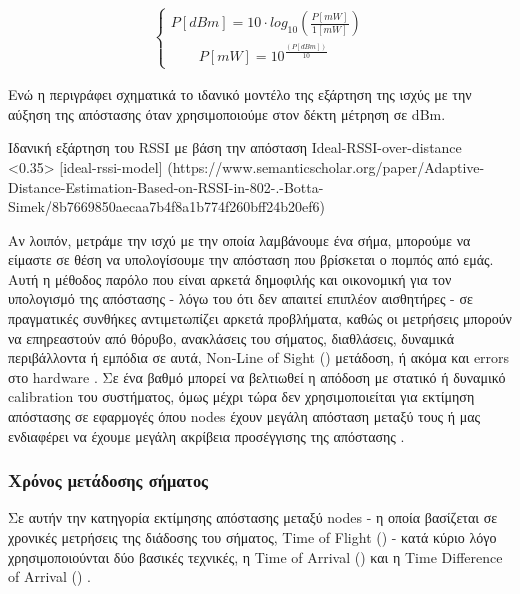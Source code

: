 \begin{align}
	\left\{
		\begin{array}{ll}
			P[dBm]= 10\cdot log_{10}\left(\frac{P[mW]}{1[mW]}\right) \\[10pt]
			\quad \quad P[mW] = 10^\frac{(P[dBm])}{10}
		\end{array}
	\right.
\end{align}

Ενώ η  περιγράφει σχηματικά το ιδανικό μοντέλο της εξάρτηση της ισχύς με την αύξηση
της απόστασης όταν χρησιμοποιούμε στον δέκτη μέτρηση σε dΒm. 


%
{Ιδανική εξάρτηση του RSSI με βάση την απόσταση}%
{Ideal-RSSI-over-distance}%
<0.35>%
[ideal-rssi-model]%
(https://www.semanticscholar.org/paper/Adaptive-Distance-Estimation-Based-on-RSSI-in-802-.-Botta-Simek/8b7669850aecaa7b4f8a1b774f260bff24b20ef6)

Αν λοιπόν, μετράμε την ισχύ με την οποία λαμβάνουμε ένα σήμα, μπορούμε να είμαστε σε θέση να υπολογίσουμε την απόσταση που βρίσκεται
ο πομπός από εμάς.
Αυτή η μέθοδος παρόλο που είναι αρκετά δημοφιλής και οικονομική για τον υπολο\-γισμό της απόστασης
- λόγω του ότι δεν απαιτεί επιπλέον αισθητήρες - σε πρα\-γματικές 
συνθήκες αντιμετωπίζει αρκετά προβλήματα, καθώς οι μετρήσεις μπορούν να επηρεαστούν από θόρυβο,
ανακλάσεις του σήματος, διαθλάσεις, δυναμικά περιβάλλοντα ή εμπόδια σε αυτά, Non-Line of Sight () μετάδοση, 
ή ακόμα και errors στο hardware 
\cite{wsn-Localization-systems} \cite{ideal-rssi-model}.
Σε ένα βαθμό μπορεί να βελτιωθεί η απόδοση με στατικό ή δυναμικό calibration του συστήματος,
όμως μέχρι τώρα δεν χρησιμοποιείται για εκτίμηση απόστασης σε εφαρμογές όπου nodes έχουν μεγάλη
απόσταση μεταξύ τους ή μας ενδιαφέρει να έχουμε μεγάλη ακρίβεια προσέγγισης της απόστασης \cite{ideal-rssi-model}.

\subsubsection{Χρόνος μετάδοσης σήματος} %
Σε αυτήν την κατηγορία εκτίμησης απόστασης μεταξύ nodes - η οποία βασίζεται σε χρονικές μετρήσεις της διάδοσης του σήματος,
 Time of Flight ()
- κατά κύριο λόγο χρησιμοποιούνται δύο βασικές τεχνικές, η Time of Arrival () και η Time 
Difference of Arrival () \cite{wsn-Localization-systems}. 

